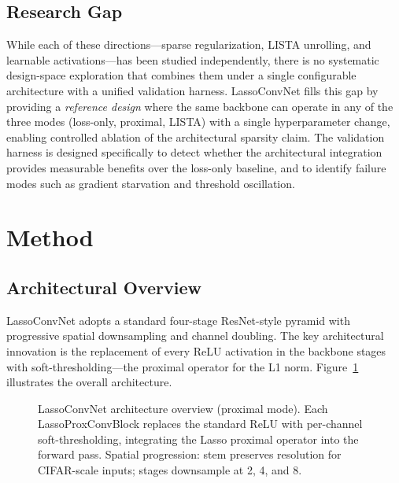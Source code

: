 \documentclass{article}
\begin{document}
\subsection{Research Gap}

While each of these directions---sparse regularization, LISTA unrolling, and
learnable activations---has been studied independently, there is no systematic
design-space exploration that combines them under a single configurable
architecture with a unified validation harness. LassoConvNet fills this gap
by providing a \emph{reference design} where the same backbone can operate in
any of the three modes (loss-only, proximal, LISTA) with a single
hyperparameter change, enabling controlled ablation of the architectural
sparsity claim. The validation harness is designed specifically to detect
whether the architectural integration provides measurable benefits over the
loss-only baseline, and to identify failure modes such as gradient starvation
and threshold oscillation.

\section{Method}
\label{sec:method}

\subsection{Architectural Overview}

LassoConvNet adopts a standard four-stage ResNet-style pyramid with progressive
spatial downsampling and channel doubling. The key architectural innovation is
the replacement of every ReLU activation in the backbone stages with
soft-thresholding---the proximal operator for the L1 norm. Figure~\ref{fig:arch}
illustrates the overall architecture.

\begin{figure}[h]
\centering
{}
\caption{LassoConvNet architecture overview (proximal mode). Each
LassoProxConvBlock replaces the standard ReLU with per-channel
soft-thresholding, integrating the Lasso proximal operator into the forward
pass. Spatial progression: stem preserves resolution for CIFAR-scale inputs;
stages downsample at 2, 4, and 8.}\label{fig:arch}
\end{figure}
\end{document}
